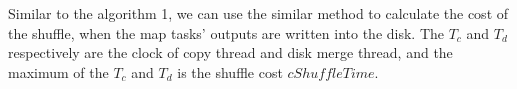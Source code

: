 Similar to the algorithm 1, we can use the similar method to calculate the cost of the shuffle, when the map tasks' outputs are written into the disk.  The $T_c$ and $T_d$ respectively are the clock of copy thread and disk merge thread, and the maximum of the $T_c$ and $T_d$ is the shuffle cost $cShuffleTime$.

